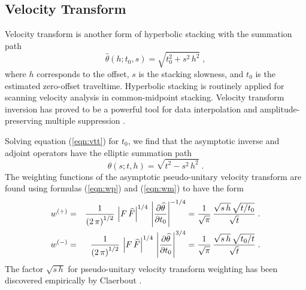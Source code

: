 \subsection{Velocity Transform}
Velocity transform is another form of hyperbolic stacking with the
summation path
\begin{equation}
\widehat{\theta}(h;t_0,s)  =  \sqrt{t_0^2 + s^2\,h^2}\;,
\label{eqn:vtt}
\end{equation}
where $h$ corresponds to the offset, $s$ is the stacking slowness, and
$t_0$ is the estimated zero-offset traveltime. Hyperbolic stacking is
routinely applied for scanning velocity analysis in common-midpoint
stacking. Velocity transform inversion has proved to be a powerful
tool for data interpolation and amplitude-preserving multiple
suppression \cite[]{Thorson.sepphd.39,Ji.sepphd.90,SEG-1995-1460}.
\par
Solving equation (\ref{eqn:vtt}) for $t_0$, we find that the asymptotic
inverse and adjoint operators have the elliptic summation path
\begin{equation}
\theta(s;t,h)  =  \sqrt{t^2 - s^2\,h^2}\;.
\end{equation}
The weighting functions of the asymptotic pseudo-unitary velocity
transform are found using formulas (\ref{eqn:wp}) and (\ref{eqn:wm})
to have the form
\begin{eqnarray}
  \label{eqn:vtpsun1}
w^{(+)} & = & {1\over{\left(2\,\pi\right)^{1/2}}} \, 
\left|F\,\widehat{F}\right|^{1/4}\,
\left|\partial \widehat{\theta} \over \partial t_0\right|^{- 1/4} =
{1\over{\sqrt{\pi}}}\, 
{{\sqrt{s\,h}\,\sqrt{t/t_0}} \over {\sqrt{t}}}\;.
 \\
 \label{eqn:vtpsun2}
w^{(-)} & = & {1\over{\left(2\,\pi\right)^{1/2}}} \, 
\left|F\,\widehat{F}\right|^{1/4}\,
\left|\partial \widehat{\theta} \over \partial t_0\right|^{3/4} =
{1\over{\sqrt{\pi}}} \, 
{{\sqrt{s\,h}\,\sqrt{t_0/t}} \over {\sqrt{t}}}\;.
\end{eqnarray}
The factor $\sqrt{s\,h}$ for pseudo-unitary velocity transform
weighting has been discovered empirically by Claerbout
.

